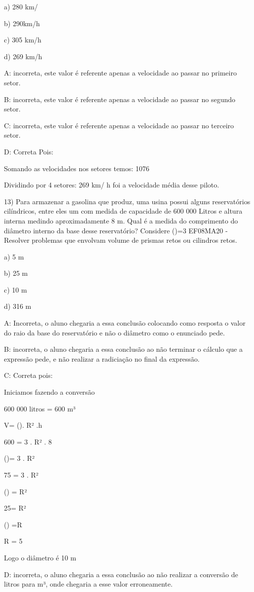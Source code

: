 a) 280 km/

b) 290km/h

c) 305 km/h

d) 269 km/h

A: incorreta, este valor é referente apenas a velocidade ao passar no
primeiro setor.

B: incorreta, este valor é referente apenas a velocidade ao passar no
segundo setor.

C: incorreta, este valor é referente apenas a velocidade ao passar no
terceiro setor.

D: Correta Pois:

Somando as velocidades nos setores temos: 1076

Dividindo por 4 setores: 269 km/ h foi a velocidade média desse piloto.

13) Para armazenar a gasolina que produz, uma usina possui alguns
reservatórios cilíndricos, entre eles um com medida de capacidade de 600
000 Litros e altura interna medindo aproximadamente 8 m. Qual é a medida
do comprimento do diâmetro interno da base desse reservatório? Considere
(\Pi)=3 EF08MA20 - Resolver problemas que envolvam volume de prismas
retos ou cilindros retos.

a) 5 m

b) 25 m

c) 10 m

d) 316 m

A: Incorreta, o aluno chegaria a essa conclusão colocando como resposta
o valor do raio da base do reservatório e não o diâmetro como o
enunciado pede.

B: incorreta, o aluno chegaria a essa conclusão ao não terminar o
cálculo que a expressão pede, e não realizar a radiciação no final da
expressão.

C: Correta pois:

Iniciamos fazendo a conversão

600 000 litros = 600 m³

V= (\Pi). R² .h

600 = 3 . R² . 8

()= 3 . R²

75 = 3 . R²

() = R²

25= R²

() =R

R = 5

Logo o diâmetro é 10 m

D: incorreta, o aluno chegaria a essa conclusão ao não realizar a
conversão de litros para m³, onde chegaria a esse valor erroneamente.

